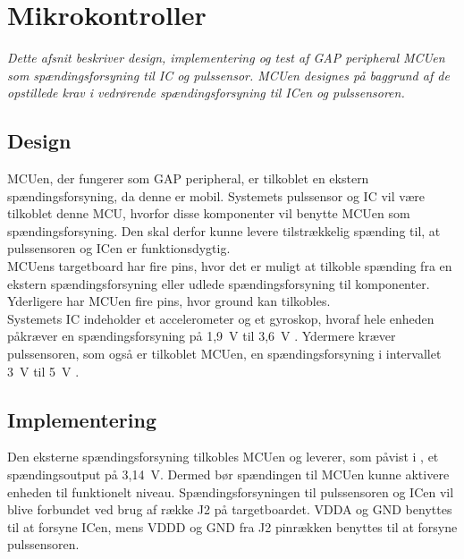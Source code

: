 \section{Mikrokontroller}
\textit{Dette afsnit beskriver design, implementering og test af GAP peripheral MCUen som spændingsforsyning til IC og pulssensor. MCUen designes på baggrund af de opstillede krav i  vedrørende spændingsforsyning til ICen og pulssensoren.}

\subsection{Design}
MCUen, der fungerer som GAP peripheral, er tilkoblet en ekstern spændingsforsyning, da denne er mobil. Systemets pulssensor og IC vil være tilkoblet denne MCU, hvorfor disse komponenter vil benytte MCUen som spændingsforsyning. Den skal derfor kunne levere tilstrækkelig spænding til, at pulssensoren og ICen er funktionsdygtig. \\
MCUens targetboard har fire pins, hvor det er muligt at tilkoble spænding fra en ekstern spændingsforsyning eller udlede spændingsforsyning til komponenter. Yderligere har MCUen fire pins, hvor ground kan tilkobles. \citep{Semiconductor2016} \\
Systemets IC indeholder et accelerometer og et gyroskop, hvoraf hele enheden påkræver en spændingsforsyning på 1,9~V til 3,6~V \citep{Jimb02016}. Ydermere kræver pulssensoren, som også er tilkoblet MCUen, en spændingsforsyning i intervallet 3~V til 5~V \citep{Murphy2016}.

\subsection{Implementering}
Den eksterne spændingsforsyning tilkobles MCUen og leverer, som påvist i , et spændingsoutput på 3,14~V. Dermed bør spændingen til MCUen kunne aktivere enheden til funktionelt niveau. %
Spændingsforsyningen til pulssensoren og ICen vil blive forbundet ved brug af række J2 på targetboardet. VDDA og GND benyttes til at forsyne ICen, mens VDDD og GND fra J2 pinrækken benyttes til at forsyne pulssensoren.

